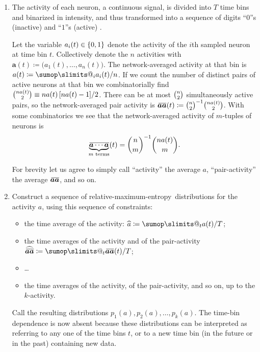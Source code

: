 \documentclass[\ifafour a4paper,12pt,\else a5paper,10pt,\fi%
onecolumn,oneside,article,%
british%
]{memoir}
\makeatletter
\theoremstyle{remark}
\theoremstyle{innote}
\def\sum{\DOTSI\sumop\slimits@}
\newcommand*{\citep}{\parencites}
\newcommand*{\defd}{\coloneqq}
\DeclarePairedDelimiter\set{\{}{\}}
\renewcommand*{\|}{\nonscript\,\vert\nonscript\;\mathopen{}}
\newcommand*{\cf}{{cf.}}
\newcommand*{\widebar}[1]{{\mkern1.5mu\skew{2}\overline{\mkern-1.5mu#1\mkern-1.5mu}\mkern 1.5mu}}
\newcommand*{\tav}{\widehat} %
\newcommand*{\av}{\widebar} %
\newcommand*{\yav}{a}
\newcommand*{\yaa}{\bm{\yav}}%
\newcommand*{\ya}{\yav}%
\newcommand*{\me}{maximum-entropy}
\makeatother
\begin{document}
\begin{enumerate}
\item The activity of each neuron, a continuous signal, is divided into $T$
  time bins and binarized in intensity, and thus transformed into a
  sequence of digits \enquote{$0$}s (inactive) and \enquote{$1$}s (active)
  \citep[\cf][]{caianiello1961,caianiello1986}.

  Let the variable $\yav_i(t)\in\set{0,1}$ denote the activity of the $i$th
  sampled neuron at time bin $t$. Collectively denote the $n$ activities
  with $\yaa(t) \defd \bigl(\yav_1(t),\dotsc,\yav_n(t)\bigr)$. The
  network-averaged activity at that bin is
  $\ya(t) \defd \sum_i \yav_i(t)/n$. If we count the number of distinct
  pairs of active neurons at that bin we combinatorially find
  $\tbinom{n\ya(t)}{2}\equiv n\ya(t)\,[n\ya(t)-1]/2$. There can be at
  most $\tbinom{n}{2}$ simultaneously active pairs, so the
  network-averaged pair activity is
  $\av{\yaa \yaa}(t) \defd \tbinom{n}{2}^{-1}\tbinom{n\ya(t)}{2}$. With some
  combinatorics we see that the network-averaged activity of $m$-tuples
  of neurons is
  \begin{equation}
    \label{eq:products_intermsof_average}
    \av{\underbrace{\yaa\dotsm\yaa}_{\text{$m$ terms}}}(t)
    = \binom{n}{m}^{-1}\binom{n\ya(t)}{m}.
  \end{equation}
  
  For brevity let us agree to simply call \enquote{activity} the average
  $\ya$, \enquote{pair-activity} the average $\av{\yaa \yaa}$, and so on.

\item Construct a sequence of relative-\me\ distributions for the activity
  $\ya$, using this sequence of constraints:
  \begin{itemize}
  \item the time average of the activity: $\tav{\ya} \defd \sum_t\ya(t)/T$;
  \item the time averages of the activity and of the pair-activity
    $\tav{\av{\yaa \yaa}} \defd \sum_t\av{\yaa \yaa}(t)/T$;
  \item \ldots
  \item the time averages of the activity, of the pair-activity, and so on, up
    to the $k$-activity.
  \end{itemize}
  Call the resulting distributions $p_1(\ya), p_2(\ya),\dotsc,p_k(\ya)$.
  The time-bin dependence is now absent because these distributions can be
  interpreted as referring to any one of the time bins $t$, or to a new
  time bin (in the future or in the past) containing new data.


\end{enumerate}
\end{document}
